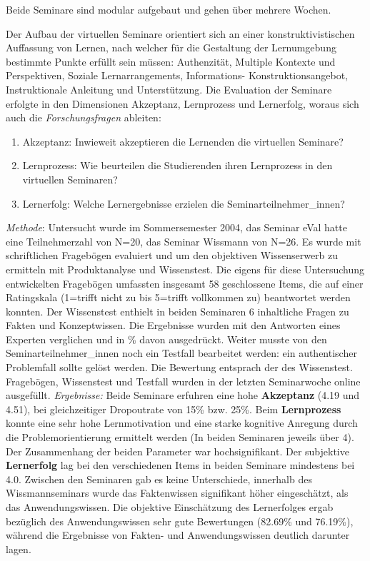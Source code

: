 Beide Seminare sind modular aufgebaut und gehen über mehrere Wochen.

Der Aufbau der virtuellen Seminare orientiert sich an einer
konstruktivistischen Auffassung von Lernen, nach welcher für die
Gestaltung der Lernumgebung bestimmte Punkte erfüllt sein müssen:
Authenzität, Multiple Kontexte und Perspektiven, Soziale
Lernarrangements, Informations- Konstruktionsangebot, Instruktionale
Anleitung und Unterstützung. Die Evaluation der Seminare erfolgte in den
Dimensionen Akzeptanz, Lernprozess und Lernerfolg, woraus sich auch die
\emph{Forschungsfragen} ableiten:

\begin{enumerate}
\def\labelenumi{\arabic{enumi}.}
\itemsep1pt\parskip0pt
\item
  Akzeptanz: Inwieweit akzeptieren die Lernenden die virtuellen
  Seminare?
\item
  Lernprozess: Wie beurteilen die Studierenden ihren Lernprozess in den
  virtuellen Seminaren?
\item
  Lernerfolg: Welche Lernergebnisse erzielen die
  Seminarteilnehmer\_innen?
\end{enumerate}

\emph{Methode}: Untersucht wurde im Sommersemester 2004, das Seminar
eVal hatte eine Teilnehmerzahl von N=20, das Seminar Wissmann von N=26.
Es wurde mit schriftlichen Fragebögen evaluiert und um den objektiven
Wissenserwerb zu ermitteln mit Produktanalyse und Wissenstest. Die
eigens für diese Untersuchung entwickelten Fragebögen umfassten
insgesamt 58 geschlossene Items, die auf einer Ratingskala (1=trifft
nicht zu bis 5=trifft vollkommen zu) beantwortet werden konnten. Der
Wissenstest enthielt in beiden Seminaren 6 inhaltliche Fragen zu Fakten
und Konzeptwissen. Die Ergebnisse wurden mit den Antworten eines
Experten verglichen und in \% davon ausgedrückt. Weiter musste von den
Seminarteilnehmer\_innen noch ein Testfall bearbeitet werden: ein
authentischer Problemfall sollte gelöst werden. Die Bewertung entsprach
der des Wissenstest. Fragebögen, Wissenstest und Testfall wurden in der
letzten Seminarwoche online ausgefüllt. \emph{Ergebnisse:} Beide
Seminare erfuhren eine hohe \textbf{Akzeptanz} (4.19 und 4.51), bei
gleichzeitiger Dropoutrate von 15\% bzw. 25\%. Beim \textbf{Lernprozess}
konnte eine sehr hohe Lernmotivation und eine starke kognitive Anregung
durch die Problemorientierung ermittelt werden (In beiden Seminaren
jeweils über 4). Der Zusammenhang der beiden Parameter war
hochsignifikant. Der subjektive \textbf{Lernerfolg} lag bei den
verschiedenen Items in beiden Seminare mindestens bei 4.0. Zwischen den
Seminaren gab es keine Unterschiede, innerhalb des Wissmannseminars
wurde das Faktenwissen signifikant höher eingeschätzt, als das
Anwendungswissen. Die objektive Einschätzung des Lernerfolges ergab
bezüglich des Anwendungswissen sehr gute Bewertungen (82.69\% und
76.19\%), während die Ergebnisse von Fakten- und Anwendungswissen
deutlich darunter lagen.

